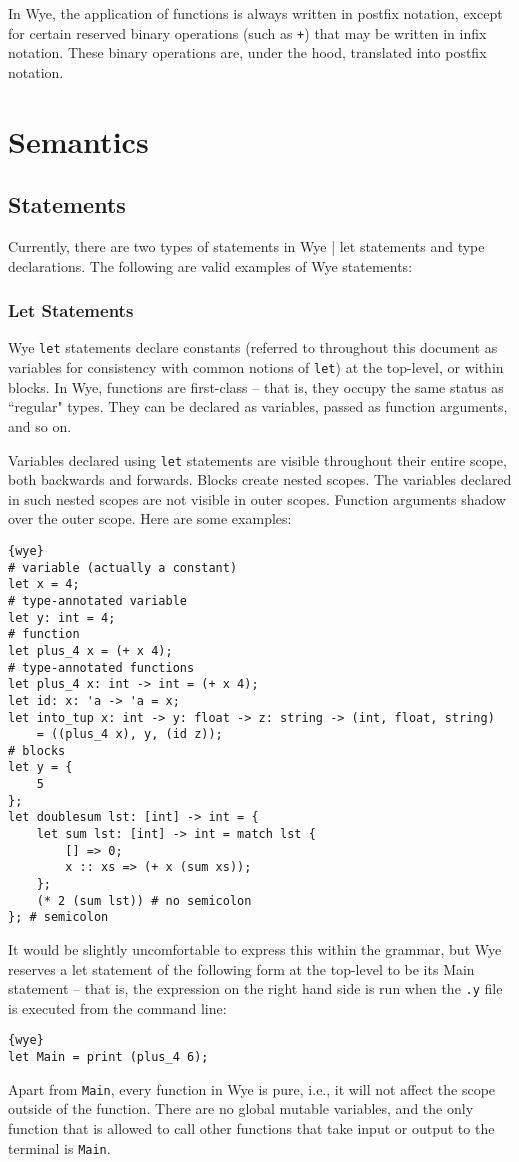 \documentclass[a4paper, 12pt]{article}
\theoremstyle{myplain}
\theoremstyle{mydefinition}
\theoremstyle{myremark}
\numberwithin{equation} {section}
\numberwithin{figure}   {section}
\numberwithin{table}    {section}
\begin{document}
In Wye, the application of functions is always written in postfix notation, except for certain reserved binary operations (such as \texttt{+}) that may be written in infix notation. These binary operations are, under the hood, translated into postfix notation.

\section{Semantics}

\subsection{Statements}
Currently, there are two types of statements in Wye | let statements and type declarations. The following are valid examples of Wye statements:

\subsubsection{Let Statements}
Wye \texttt{let} statements declare constants (referred to throughout this document as variables for consistency with common notions of \texttt{let}) at the top-level, or within blocks. In Wye, functions are first-class -- that is, they occupy the same status as ``regular" types. They can be declared as variables, passed as function arguments, and so on.

Variables declared using \texttt{let} statements are visible throughout their entire scope, both backwards and forwards. Blocks create nested scopes. The variables declared in such nested scopes are not visible in outer scopes. Function arguments shadow over the outer scope. Here are some examples:
\begin{lstlisting}{wye}
# variable (actually a constant)
let x = 4;
# type-annotated variable
let y: int = 4;
# function
let plus_4 x = (+ x 4);
# type-annotated functions
let plus_4 x: int -> int = (+ x 4);
let id: x: 'a -> 'a = x;
let into_tup x: int -> y: float -> z: string -> (int, float, string)
	= ((plus_4 x), y, (id z));
# blocks
let y = {
	5
};
let doublesum lst: [int] -> int = {
	let sum lst: [int] -> int = match lst {
		[] => 0;
		x :: xs => (+ x (sum xs));
	};
	(* 2 (sum lst)) # no semicolon
}; # semicolon
\end{lstlisting}
It would be slightly uncomfortable to express this within the grammar, but Wye reserves a let statement of the following form at the top-level to be its Main statement -- that is, the expression on the right hand side is run when the \texttt{.y} file is executed from the command line:
\begin{lstlisting}{wye}
let Main = print (plus_4 6);
\end{lstlisting}
Apart from \texttt{Main}, every function in Wye is pure, i.e., it will not affect the scope outside of the function. There are no global mutable variables, and the only function that is allowed to call other functions that take input or output to the terminal is \texttt{Main}.
\end{document}
